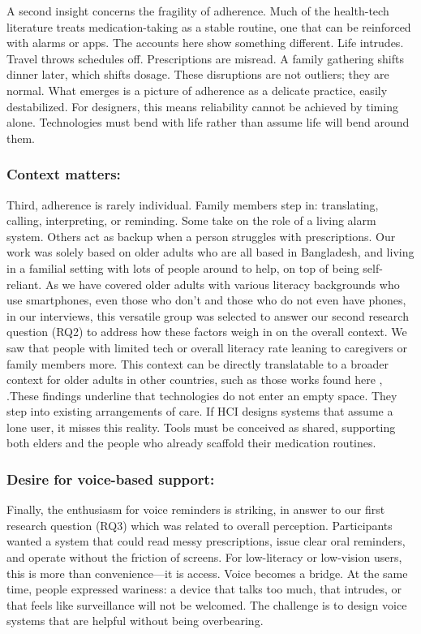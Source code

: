 \documentclass[acmlarge]{acmart}
\begin{document}
A second insight concerns the fragility of adherence. Much of the
health-tech literature treats medication-taking as a stable routine, one
that can be reinforced with alarms or apps. The accounts here show
something different. Life intrudes. Travel throws schedules off.
Prescriptions are misread. A family gathering shifts dinner later, which
shifts dosage. These disruptions are not outliers; they are normal. What
emerges is a picture of adherence as a delicate practice, easily
destabilized. For designers, this means reliability cannot be achieved
by timing alone. Technologies must bend with life rather than assume
life will bend around them.

\subsubsection{Context matters: }
Third, adherence is rarely individual. Family members step in:
translating, calling, interpreting, or reminding. Some take on the role
of a living alarm system. Others act as backup when a person struggles
with prescriptions. Our work was solely based on older adults who are
all based in Bangladesh, and living in a familial setting with lots of
people around to help, on top of being self-reliant. As we have covered
older adults with various literacy backgrounds who use smartphones, even
those who don't and those who do not even have phones, in our
interviews, this versatile group was selected to answer our second
research question (RQ2) to address how these factors weigh in on the
overall context. We saw that people with limited tech or overall
literacy rate leaning to caregivers or family members more. This context
can be directly translatable to a broader context for older adults in
other countries, such as those works found here \cite{10.1007/978-3-030-83164-6_5}, \cite{10.1145/3491101.3519642}
.These findings underline that technologies do not enter an empty space.
They step into existing arrangements of care. If HCI designs systems
that assume a lone user, it misses this reality. \cite{10.1145/3706598.3713755} Tools
must be conceived as shared, supporting both elders and the people who
already scaffold their medication routines.

\subsubsection{Desire for voice-based support: }
Finally, the enthusiasm for voice reminders is striking, in answer to
our first research question (RQ3) which was related to overall
perception. Participants wanted a system that could read messy
prescriptions, issue clear oral reminders, and operate without the
friction of screens. \cite{MAO202263} For low-literacy or low-vision
users, this is more than convenience---it is access. Voice becomes a
bridge. \cite{10.1145/3706599.3719892}At the same time, people expressed wariness: a
device that talks too much, that intrudes, or that feels like
surveillance will not be welcomed. The challenge is to design voice
systems that are helpful without being overbearing.
\end{document}
